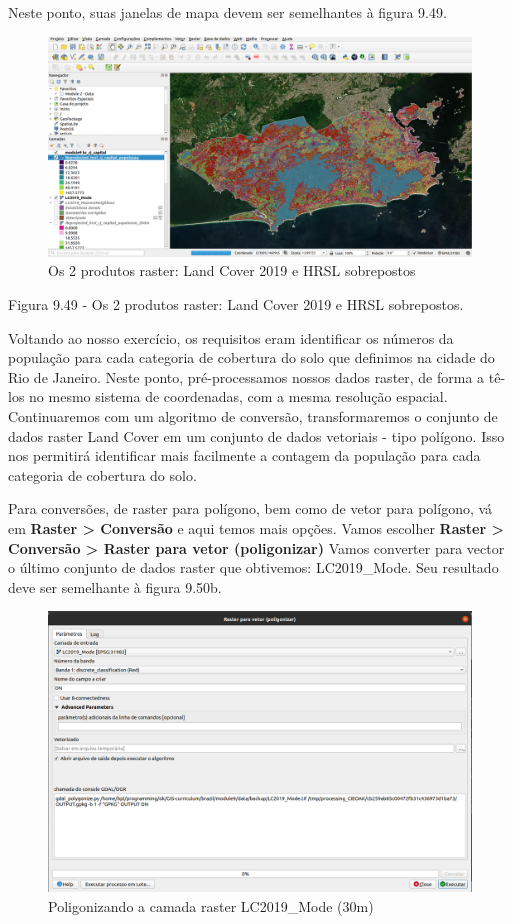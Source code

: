 \documentclass[
]{krantz}
\begin{document}
Neste ponto, suas janelas de mapa devem ser semelhantes à figura 9.49.

\begin{figure}
\centering
\includegraphics{media/modulo9/fig949.png}
\caption{Os 2 produtos raster: Land Cover 2019 e HRSL sobrepostos}
\end{figure}

Figura 9.49 - Os 2 produtos raster: Land Cover 2019 e HRSL sobrepostos.

Voltando ao nosso exercício, os requisitos eram identificar os números da população para cada categoria de cobertura do solo que definimos na cidade do Rio de Janeiro. Neste ponto, pré-processamos nossos dados raster, de forma a tê-los no mesmo sistema de coordenadas, com a mesma resolução espacial. Continuaremos com um algoritmo de conversão, transformaremos o conjunto de dados raster Land Cover em um conjunto de dados vetoriais - tipo polígono. Isso nos permitirá identificar mais facilmente a contagem da população para cada categoria de cobertura do solo.

Para conversões, de raster para polígono, bem como de vetor para polígono, vá em \textbf{Raster \textgreater{} Conversão} e aqui temos mais opções. Vamos escolher \textbf{Raster \textgreater{} Conversão \textgreater{} Raster para vetor (poligonizar)} Vamos converter para vector o último conjunto de dados raster que obtivemos: LC2019\_Mode. Seu resultado deve ser semelhante à figura 9.50b.

\begin{figure}
\centering
\includegraphics{media/modulo9/fig950_a.png}
\caption{Poligonizando a camada raster LC2019\_Mode (30m)}
\end{figure}
\end{document}
